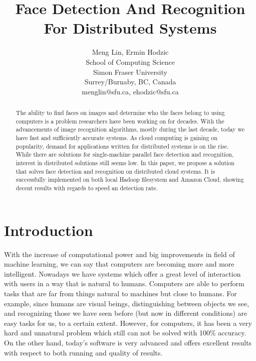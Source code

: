 \documentclass[11pt, draftclsnofoot, onecolumn]{IEEEtran}
\begin{document}
\title{Face Detection And Recognition For Distributed Systems}

\author{Meng Lin, Ermin Hodzic\\
        School of Computing Science\\
        Simon Fraser University\\
        Surrey/Burnaby, BC, Canada \\
        menglin@sfu.ca, ehodzic@sfu.ca  \\ 
}



\date{}
\maketitle

\begin{abstract}

The ability to find faces on images and determine who the faces belong to using computers is a problem researchers have been working on for decades. With the advancements of image recognition algorithms, mostly during the last decade, today we have fast and sufficiently accurate systems. As cloud computing is gaining on popularity, demand for applications written for distributed systems is on the rise. While there are solutions for single-machine parallel face detection and recognition, interest in distributed solutions still seems low. In this paper, we propose a solution that solves face detection and recognition on distributed cloud systems. It is successfully implemented on both local Hadoop filesystem and Amazon Cloud, showing decent results with regards to speed an detection rate.

\end{abstract}


\section{Introduction} \label{sec:introduction}

With the increase of computational power and big improvements in field of machine learning, we can say that computers are becoming more and more intelligent. Nowadays we have systems which offer a great level of interaction with users in a way that is natural to humans. Computers are able to perform tasks that are far from things natural to machines but close to humans. For example, since humans are visual beings, distinguishing between objects we see, and recognizing those we have seen before (but now in different conditions) are easy tasks for us, to a certain extent. However, for computers, it has been a very hard and unnatural problem which still can not be solved with 100\% accuracy. On the other hand, today's software is very advanced and offers excellent results with respect to both running and quality of results.
\end{document}
